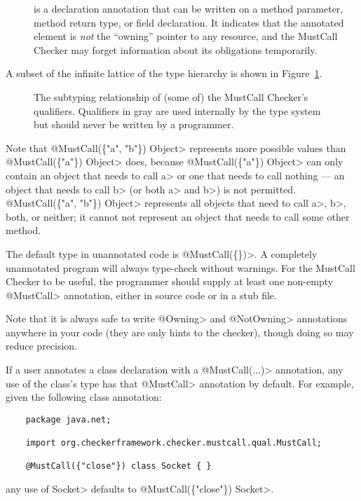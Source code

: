 \begin{description}
\item[]
  is a declaration annotation that can be written on a method parameter, method return type, or
  field declaration. It indicates that the annotated element is \emph{not} the ``owning'' pointer to any resource,
  and the MustCall Checker may forget information about its obligations temporarily.

\end{description}

A subset of the infinite lattice of the type hierarchy is shown in Figure~\ref{fig-must-call-hierarchy}.

\begin{figure}
\caption{The subtyping relationship of (some of) the MustCall Checker's qualifiers.
Qualifiers in gray are used internally by the type system but should
never be written by a programmer.}
\label{fig-must-call-hierarchy}
\end{figure}

Note that \<@MustCall(\{"a", "b"\}) Object> represents more possible values than
\<@MustCall(\{"a"\}) Object> does, because \<@MustCall(\{"a"\}) Object> can only
contain an object that needs to call \<a> or one that needs to call nothing --- an
object that needs to call \<b> (or both \<a> and \<b>) is not permitted.
\<@MustCall(\{"a", "b"\}) Object> represents all objects that need to
call \<a>, \<b>, both, or neither; it cannot not represent an object that needs
to call some other method.

The default type in unannotated code is \<@MustCall(\{\})>.
A completely unannotated program will always type-check without warnings.
For the MustCall Checker to be useful, the programmer should supply at least one non-empty
\<@MustCall> annotation, either in source code or in a stub file.

Note that it is always safe to write \<@Owning> and \<@NotOwning> annotations anywhere in your
code (they are only hints to the checker), though doing so may reduce precision.


If a user annotates a class declaration with a \<@MustCall(...)> annotation, any use of the class's
type has that \<@MustCall> annotation by default. For example, given the following class annotation:
\begin{Verbatim}
    package java.net;

    import org.checkerframework.checker.mustcall.qual.MustCall;

    @MustCall({"close"}) class Socket { }
\end{Verbatim}
any use of \<Socket> defaults to \<@MustCall(\{"close"\}) Socket>.

